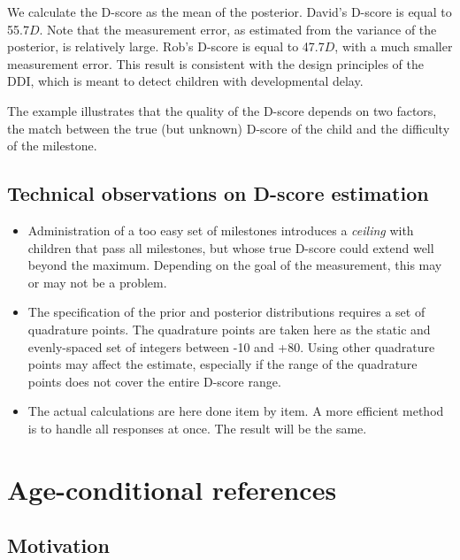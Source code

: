 \documentclass[
]{book}
\begin{document}
We calculate the D-score as the mean of the posterior. David's D-score is equal to 55.7\(D\). Note that the measurement error, as estimated from the variance of the posterior, is relatively large. Rob's D-score is equal to 47.7\(D\), with a much smaller measurement error. This result is consistent with the design principles of the DDI, which is meant to detect children with developmental delay.

The example illustrates that the quality of the D-score depends on two factors, the match between the true (but unknown) D-score of the child and the difficulty of the milestone.

\hypertarget{technical-observations-on-d-score-estimation}{%
\subsection{Technical observations on D-score estimation}\label{technical-observations-on-d-score-estimation}}

\begin{itemize}
\item
  Administration of a too easy set of milestones introduces a \emph{ceiling} with children that pass all milestones, but whose true D-score could extend well beyond the maximum. Depending on the goal of the measurement, this may or may not be a problem.
\item
  The specification of the prior and posterior distributions requires a set of quadrature points. The quadrature points are taken here as the static and evenly-spaced set of integers between -10 and +80. Using other quadrature points may affect the estimate, especially if the range of the quadrature points does not cover the entire D-score range.
\item
  The actual calculations are here done item by item. A more efficient method is to handle all responses at once. The result will be the same.
\end{itemize}

\hypertarget{sec:reference}{%
\section{Age-conditional references}\label{sec:reference}}

\hypertarget{motivation}{%
\subsection{Motivation}\label{motivation}}
\end{document}

